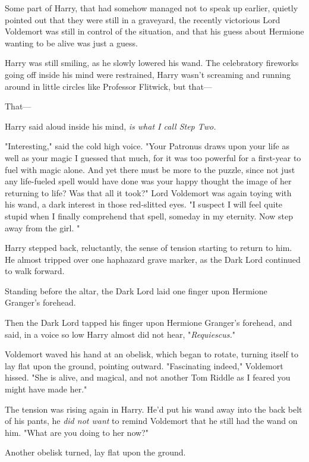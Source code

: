 Some part of Harry, that had somehow managed not to speak up earlier, quietly
pointed out that they were still in a graveyard, the recently victorious Lord
Voldemort was still in control of the situation, and that his guess about
Hermione wanting to be alive was just a guess.

Harry was still smiling, as he slowly lowered his wand. The celebratory
fireworks going off inside his mind were restrained, Harry wasn't screaming and
running around in little circles like Professor Flitwick, but that\mbox{---}

That\mbox{---}

\emph{} Harry said aloud inside his mind, \emph{ is what I call Step
Two.}

"Interesting," said the cold high voice. "Your Patronus draws upon your life as
well as your magic{\el} I guessed that much, for it was too powerful for a
first-year to fuel with magic alone. And yet there must be more to the puzzle,
since not just any life-fueled spell would have done{\el} was your happy
thought the image of her returning to life? Was that all it took?" Lord
Voldemort was again toying with his wand, a dark interest in those red-slitted
eyes. "I suspect I will feel quite stupid when I finally comprehend that spell,
someday in my eternity. Now step away from the girl. "

Harry stepped back, reluctantly, the sense of tension starting to return to
him. He almost tripped over one haphazard grave marker, as the Dark Lord
continued to walk forward.

Standing before the altar, the Dark Lord laid one finger upon Hermione
Granger's forehead.

Then the Dark Lord tapped his finger upon Hermione Granger's forehead, and
said, in a voice so low Harry almost did not hear, "\emph{Requiescus.}"

Voldemort waved his hand at an obelisk, which began to rotate, turning itself
to lay flat upon the ground, pointing outward. "Fascinating indeed," Voldemort
hissed. "She is alive, and magical, and not another Tom Riddle as I feared you
might have made her."

The tension was rising again in Harry. He'd put his wand away into the back
belt of his pants, he \emph{did not want} to remind Voldemort that he still had
the wand on him. "What are you doing to her now?"

Another obelisk turned, lay flat upon the ground. 

